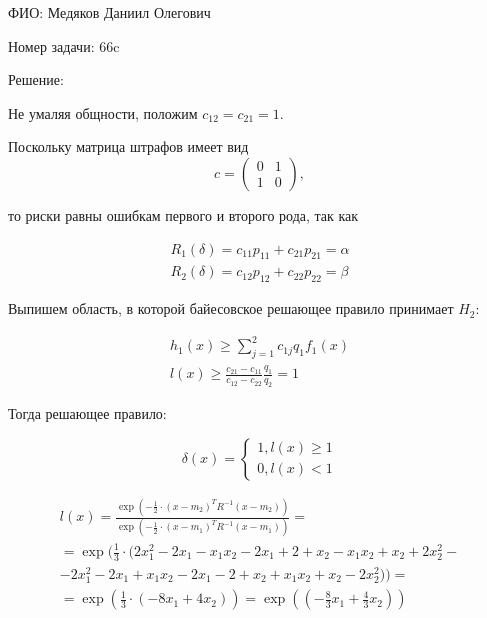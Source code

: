 \documentclass[14pt]{extarticle}
\begin{document}
ФИО: Медяков Даниил Олегович

\vspace{10pt}

Номер задачи: 66c

\vspace{10pt}

Решение:

\vspace{10pt}

Не умаляя общности, положим $c_{12} = c_{21} = 1$.

Поскольку матрица штрафов имеет вид 
\begin{equation*}
    c = 
    \begin{pmatrix}
      0& 1\\
      1& 0
    \end{pmatrix},
\end{equation*}

то риски равны ошибкам первого и второго рода, так как

\begin{gather*}
    R_1(\delta) = c_{11}p_{11} + c_{21}p_{21} = \alpha\\
    R_2(\delta) = c_{12}p_{12} + c_{22}p_{22} = \beta
\end{gather*}

Выпишем область, в которой байесовское решающее правило принимает $H_2$:

\begin{gather*}
    h_1(x) \geqslant \sum\limits_{j=1}^2 c_{1j}q_1f_1(x)\\
    l(x) \geqslant \frac{c_{21} - c_{11}}{c_{12} - c_{22}}\frac{q_1}{q_2} = 1
\end{gather*}

Тогда решающее правило:

\begin{equation*}
    \delta(x)=
    \begin{cases}
        1, l(x) \geqslant 1\\
        0, l(x) < 1
    \end{cases}
\end{equation*}

\begin{gather*}
    l(x)=\frac{\exp\left(-\frac{1}{2} \cdot(x-m_2)^T R^{-1}(x-m_2)\right)}{\exp\left(-\frac{1}{2} \cdot(x-m_1)^T R^{-1}(x-m_1)\right)} =
    \\
    = \exp (\frac{1}{3} \cdot(2x_1^2-2x_1-x_1x_2-2x_1+2+x_2-x_1x_2+x_2+2x_2^2 - \\ - 2x_1^2-2x_1+x_1x_2-2x_1-2+x_2+x_1x_2+x_2-2x_2^2))
    = \\
    =\exp \left(\frac{1}{3} \cdot\left(-8x_1+4x_2 \right)\right) = \exp \left(\left(-\frac{8}{3}x_1+\frac{4}{3}x_2 \right)\right)
\end{gather*}
\end{document}
